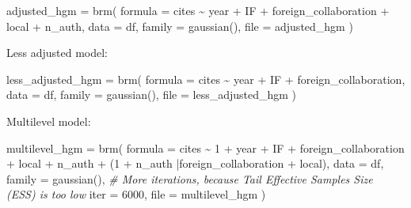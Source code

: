 \documentclass[
]{article}
\newenvironment{Shaded}{\begin{snugshade}}{\end{snugshade}}
\newcommand{\AttributeTok}[1]{\textcolor[rgb]{0.77,0.63,0.00}{#1}}
\newcommand{\CommentTok}[1]{\textcolor[rgb]{0.56,0.35,0.01}{\textit{#1}}}
\newcommand{\DecValTok}[1]{\textcolor[rgb]{0.00,0.00,0.81}{#1}}
\newcommand{\FunctionTok}[1]{\textcolor[rgb]{0.00,0.00,0.00}{#1}}
\newcommand{\NormalTok}[1]{#1}
\newcommand{\OtherTok}[1]{\textcolor[rgb]{0.56,0.35,0.01}{#1}}
\newcommand{\SpecialCharTok}[1]{\textcolor[rgb]{0.00,0.00,0.00}{#1}}
\newcommand{\StringTok}[1]{\textcolor[rgb]{0.31,0.60,0.02}{#1}}
\begin{document}
\begin{Shaded}
\begin{Highlighting}[]
\NormalTok{adjusted\_hgm }\OtherTok{=} \FunctionTok{brm}\NormalTok{(}
  \AttributeTok{formula =}\NormalTok{ cites }\SpecialCharTok{\textasciitilde{}}\NormalTok{ year }\SpecialCharTok{+}\NormalTok{ IF }\SpecialCharTok{+}\NormalTok{ foreign\_collaboration }\SpecialCharTok{+}\NormalTok{ local }\SpecialCharTok{+}\NormalTok{ n\_auth,}
  \AttributeTok{data =}\NormalTok{ df,}
  \AttributeTok{family =} \FunctionTok{gaussian}\NormalTok{(),}
  \AttributeTok{file =} \StringTok{\textquotesingle{}adjusted\_hgm\textquotesingle{}}
\NormalTok{)}
\end{Highlighting}
\end{Shaded}

Less adjusted model:

\begin{Shaded}
\begin{Highlighting}[]
\NormalTok{less\_adjusted\_hgm }\OtherTok{=} \FunctionTok{brm}\NormalTok{(}
  \AttributeTok{formula =}\NormalTok{ cites }\SpecialCharTok{\textasciitilde{}}\NormalTok{ year }\SpecialCharTok{+}\NormalTok{ IF }\SpecialCharTok{+}\NormalTok{ foreign\_collaboration,}
  \AttributeTok{data =}\NormalTok{ df,}
  \AttributeTok{family =} \FunctionTok{gaussian}\NormalTok{(),}
  \AttributeTok{file =} \StringTok{\textquotesingle{}less\_adjusted\_hgm\textquotesingle{}}
\NormalTok{)}
\end{Highlighting}
\end{Shaded}

Multilevel model:

\begin{Shaded}
\begin{Highlighting}[]
\NormalTok{multilevel\_hgm }\OtherTok{=} \FunctionTok{brm}\NormalTok{(}
  \AttributeTok{formula =}\NormalTok{ cites }\SpecialCharTok{\textasciitilde{}} \DecValTok{1} \SpecialCharTok{+}\NormalTok{ year }\SpecialCharTok{+}\NormalTok{ IF }\SpecialCharTok{+}\NormalTok{ foreign\_collaboration }\SpecialCharTok{+}\NormalTok{ local }\SpecialCharTok{+}\NormalTok{ n\_auth }\SpecialCharTok{+}
\NormalTok{    (}\DecValTok{1} \SpecialCharTok{+}\NormalTok{ n\_auth }\SpecialCharTok{|}\NormalTok{foreign\_collaboration }\SpecialCharTok{+}\NormalTok{ local),}
  \AttributeTok{data =}\NormalTok{ df,}
  \AttributeTok{family =} \FunctionTok{gaussian}\NormalTok{(),}
  \CommentTok{\# More iterations, because Tail Effective Samples Size (ESS) is too low}
  \AttributeTok{iter =} \DecValTok{6000}\NormalTok{,}
  \AttributeTok{file =} \StringTok{\textquotesingle{}multilevel\_hgm\textquotesingle{}}
\NormalTok{)}
\end{Highlighting}
\end{Shaded}
\end{document}
